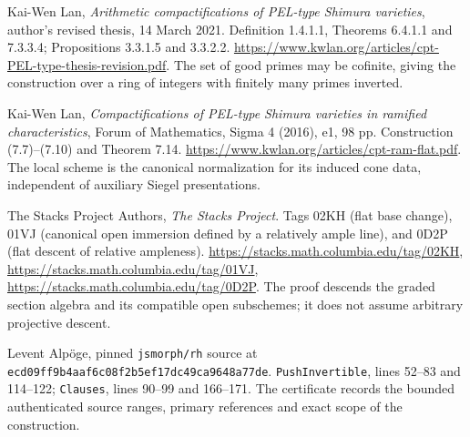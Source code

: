 Kai-Wen Lan, \emph{Arithmetic compactifications of PEL-type Shimura
varieties}, author's revised thesis, 14 March 2021.
Definition 1.4.1.1, Theorems 6.4.1.1 and 7.3.3.4;
Propositions 3.3.1.5 and 3.3.2.2.
\url{https://www.kwlan.org/articles/cpt-PEL-type-thesis-revision.pdf}.
The set of good primes may be cofinite, giving the construction
over a ring of integers with finitely many primes inverted.

Kai-Wen Lan, \emph{Compactifications of PEL-type Shimura varieties
in ramified characteristics}, Forum of Mathematics, Sigma 4 (2016),
e1, 98 pp.  Construction (7.7)--(7.10) and Theorem 7.14.
\url{https://www.kwlan.org/articles/cpt-ram-flat.pdf}.
The local scheme is the canonical normalization for its induced
cone data, independent of auxiliary Siegel presentations.

The Stacks Project Authors, \emph{The Stacks Project}.
Tags 02KH (flat base change), 01VJ (canonical open immersion
defined by a relatively ample line), and 0D2P (flat descent of
relative ampleness).
\url{https://stacks.math.columbia.edu/tag/02KH},
\url{https://stacks.math.columbia.edu/tag/01VJ},
\url{https://stacks.math.columbia.edu/tag/0D2P}.
The proof descends the graded section algebra and its compatible
open subschemes; it does not assume arbitrary projective descent.

Levent Alp\"oge, pinned \texttt{jsmorph/rh} source at
\texttt{ecd09ff9b4aaf6c08f2b5ef17dc49ca9648a77de}.
\texttt{PushInvertible}, lines 52--83 and 114--122;
\texttt{Clauses}, lines 90--99 and 166--171.
The certificate records the bounded authenticated source ranges,
primary references and exact scope of the construction.
